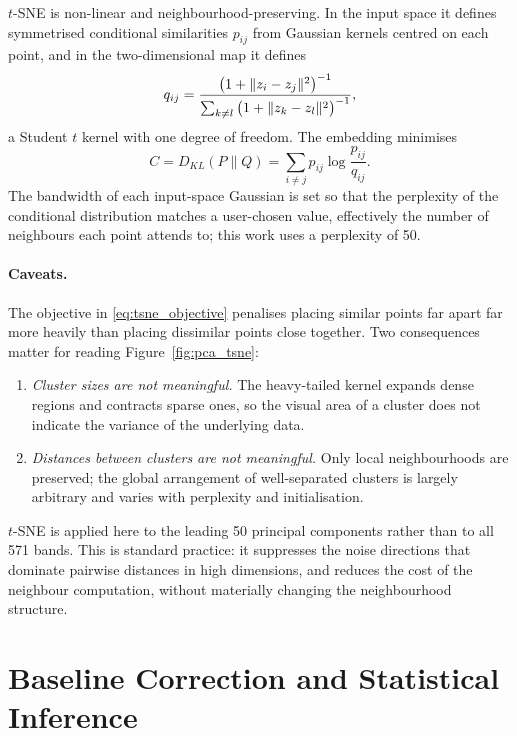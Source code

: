 $t$-SNE \cite{vandermaaten2008tsne} is non-linear and neighbourhood-preserving. In the input
space it defines symmetrised conditional similarities $p_{ij}$ from Gaussian kernels centred
on each point, and in the two-dimensional map it defines
\begin{equation}
q_{ij} = \frac{\big(1 + \lVert z_i - z_j\rVert^2\big)^{-1}}
              {\sum_{k \ne l} \big(1 + \lVert z_k - z_l\rVert^2\big)^{-1}},
\label{eq:tsne_q}
\end{equation}
a Student $t$ kernel with one degree of freedom. The embedding minimises
\begin{equation}
C = D_{KL}(P \| Q) = \sum_{i \ne j} p_{ij} \log \frac{p_{ij}}{q_{ij}} .
\label{eq:tsne_objective}
\end{equation}
The bandwidth of each input-space Gaussian is set so that the perplexity of the conditional
distribution matches a user-chosen value, effectively the number of neighbours each point
attends to; this work uses a perplexity of 50.

\paragraph{Caveats.} The objective in \eqref{eq:tsne_objective} penalises placing similar
points far apart far more heavily than placing dissimilar points close together. Two
consequences matter for reading Figure~\ref{fig:pca_tsne}:
\begin{enumerate}
  \item \emph{Cluster sizes are not meaningful.} The heavy-tailed kernel expands dense regions
        and contracts sparse ones, so the visual area of a cluster does not indicate the
        variance of the underlying data.
  \item \emph{Distances between clusters are not meaningful.} Only local neighbourhoods are
        preserved; the global arrangement of well-separated clusters is largely arbitrary and
        varies with perplexity and initialisation.
\end{enumerate}


$t$-SNE is applied here to the leading 50 principal components rather than to all 571 bands.
This is standard practice: it suppresses the noise directions that dominate pairwise distances
in high dimensions, and reduces the cost of the neighbour computation, without materially
changing the neighbourhood structure.


\section{Baseline Correction and Statistical Inference}
\label{sec:airpls_bootstrap}

